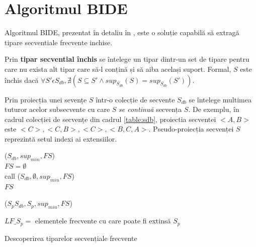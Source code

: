 \section{Algoritmul BIDE}
Algoritmul BIDE, prezentat în detaliu în \cite{bib:wang2004bide}, este o soluție capabilă să extragă tipare secventiale frecvente inchise.

\begin{defi}
Prin \textbf{tipar secvential închis} se întelege un tipar dintr-un set de tipare pentru care nu exista alt tipar care să-l conțină și să aiba același suport. Formal, $S$ este închis dacă $\forall S' \epsilon S_{db}, \nexists (S \subseteq S' \wedge sup_{S_{db}}(S)=sup_{S_{db}}(S'))$.
\end{defi}  

\begin{defi}
Prin proiecția unei sevențe $S$ într-o colecție de secvente $S_{db}$ se întelege multimea tuturor acelor subsecvente cu care $S$ \textit{se continuă} secvența $S$. De exemplu, în cadrul colecției de secvențe din cadrul \ref{table:sdb}, proiectia secventei $<A,B>$ este {$<C>,<C, B>,<C>,<B, C, A>$}. Pseudo-proiecția secvenței $S$ reprezintă setul indexi ai extensiilor. 
\end{defi}  


\begin{algorithm}[H]
\SetAlgoLined
{}
\fse($S_{db}, sup_{min}, FS$) \\
$FS = \emptyset$ \\
call \fs($S_{db}, \emptyset, sup_{min}, FS$) \\
\KwRet $FS$ \\

\BlankLine
\BlankLine

\fs($S_pS_{db}, S_p, sup_{min}, FS$) \\


$LF\_S_p =$ elementele frecvente cu care poate fi extinsă $S_p$

 {
\KwRet
}

\caption{Descoperirea tiparelor secvențiale frecvente}
\label{algo:fse}
\end{algorithm}

